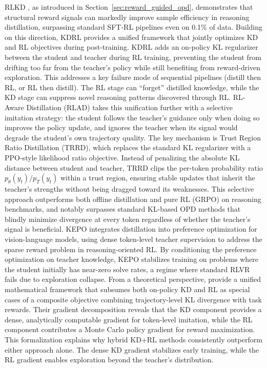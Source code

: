 \documentclass{article} %
\newcommand{\ptheta}{p_\theta}
\newcommand{\pteacher}{p_T}
\begin{document}
RLKD \citep{2505.16142}, as introduced in Section~\ref{sec:reward_guided_opd}, demonstrates that structural reward signals can markedly improve sample efficiency in reasoning distillation, surpassing standard SFT-RL pipelines even on 0.1\% of data.
Building on this direction, KDRL \citep{2506.02208} provides a unified framework that jointly optimizes KD and RL objectives during post-training. KDRL adds an on-policy KL regularizer between the student and teacher during RL training, preventing the student from drifting too far from the teacher's policy while still benefiting from reward-driven exploration. This addresses a key failure mode of sequential pipelines (distill then RL, or RL then distill). The RL stage can ``forget'' distilled knowledge, while the KD stage can suppress novel reasoning patterns discovered through RL.
RL-Aware Distillation (RLAD) \citep{2602.22495} takes this unification further with a selective imitation strategy: the student follows the teacher's guidance only when doing so improves the policy update, and ignores the teacher when its signal would degrade the student's own trajectory quality. The key mechanism is Trust Region Ratio Distillation (TRRD), which replaces the standard KL regularizer with a PPO-style likelihood ratio objective. Instead of penalizing the absolute KL distance between student and teacher, TRRD clips the per-token probability ratio $\ptheta(y_t)/\pteacher(y_t)$ within a trust region, ensuring stable updates that inherit the teacher's strengths without being dragged toward its weaknesses. This selective approach outperforms both offline distillation and pure RL (GRPO) on reasoning benchmarks, and notably surpasses standard KL-based OPD methods that blindly minimize divergence at every token regardless of whether the teacher's signal is beneficial.
KEPO \citep{2602.00400} integrates distillation into preference optimization for vision-language models, using dense token-level teacher supervision to address the sparse reward problem in reasoning-oriented RL. By conditioning the preference optimization on teacher knowledge, KEPO stabilizes training on problems where the student initially has near-zero solve rates, a regime where standard RLVR fails due to exploration collapse.
From a theoretical perspective, \citet{2512.23097} provide a unified mathematical framework that subsumes both on-policy KD and RL as special cases of a composite objective combining trajectory-level KL divergence with task rewards. Their gradient decomposition reveals that the KD component provides a dense, analytically computable gradient for token-level imitation, while the RL component contributes a Monte Carlo policy gradient for reward maximization. This formalization explains why hybrid KD+RL methods consistently outperform either approach alone. The dense KD gradient stabilizes early training, while the RL gradient enables exploration beyond the teacher's distribution.
\end{document}
